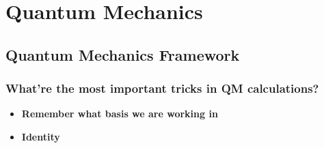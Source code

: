 \documentclass[letterpaper,10pt,english]{sphinxmanual}
\begin{document}
\section{Quantum Mechanics}
\label{Quantum/QuantumMechanics:quantum-mechanics}\label{Quantum/QuantumMechanics::doc}

\subsection{Quantum Mechanics Framework}
\label{Quantum/QuantumMechanics:quantum-mechanics-framework}

\subsubsection{What're the most important tricks in QM calculations?}
\label{Quantum/QuantumMechanics:what-re-the-most-important-tricks-in-qm-calculations}\begin{itemize}
\item {} 
\textbf{Remember what basis we are working in}

\item {} 
\textbf{Identity}

\end{itemize}
\end{document}
